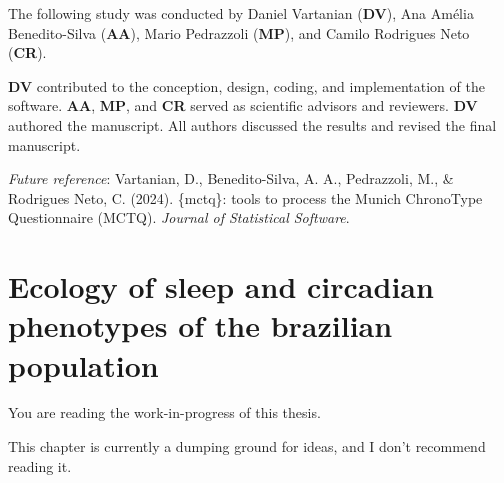 \documentclass[
12pt,
openright,
oneside,
a4paper,
chapter=TITLE,
section=TITLE,
french,
spanish,
brazil,
english
]{abntex2}\usepackage{array}
\newcommand{\microskip}{\vspace{\microskipamount}}
\begin{document}
\begin{tcolorbox}[enhanced jigsaw, arc=.35mm, toprule=.15mm, opacitybacktitle=0.6, rightrule=.15mm, opacityback=0, colframe=quarto-callout-note-color-frame, titlerule=0mm, colback=white, toptitle=1mm, coltitle=black, left=2mm, colbacktitle=quarto-callout-note-color!10!white, title=\textcolor{quarto-callout-note-color}{\faInfo}\hspace{0.5em}{Note}, bottomrule=.15mm, breakable, bottomtitle=1mm, leftrule=.75mm]

The following study was conducted by Daniel Vartanian (\textbf{DV}), Ana
Amélia Benedito-Silva (\textbf{AA}), Mario Pedrazzoli (\textbf{MP}), and
Camilo Rodrigues Neto (\textbf{CR}).

\microskip

\textbf{DV} contributed to the conception, design, coding, and
implementation of the software. \textbf{AA}, \textbf{MP}, and
\textbf{CR} served as scientific advisors and reviewers. \textbf{DV}
authored the manuscript. All authors discussed the results and revised
the final manuscript.

\microskip

\emph{Future reference}: Vartanian, D., Benedito-Silva, A. A.,
Pedrazzoli, M., \& Rodrigues Neto, C. (2024). \{mctq\}: tools to process
the Munich ChronoType Questionnaire (MCTQ). \emph{Journal of Statistical
Software}.

\end{tcolorbox}


\chapter{Ecology of sleep and circadian phenotypes of the brazilian
population}\label{ecology-of-sleep-and-circadian-phenotypes-of-the-brazilian-population}

\begin{tcolorbox}[enhanced jigsaw, arc=.35mm, toprule=.15mm, opacitybacktitle=0.6, rightrule=.15mm, opacityback=0, colframe=quarto-callout-important-color-frame, titlerule=0mm, colback=white, toptitle=1mm, coltitle=black, left=2mm, colbacktitle=quarto-callout-important-color!10!white, title=\textcolor{quarto-callout-important-color}{\faExclamation}\hspace{0.5em}{Important}, bottomrule=.15mm, breakable, bottomtitle=1mm, leftrule=.75mm]

You are reading the work-in-progress of this thesis.

\microskip

This chapter is currently a dumping ground for ideas, and I don't
recommend reading it.

\end{tcolorbox}
\end{document}
